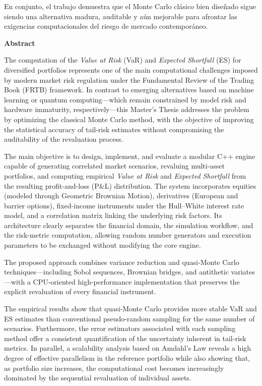 \documentclass[11pt]{article}
\begin{document}
En conjunto, el trabajo demuestra que el Monte Carlo clásico bien diseñado sigue siendo una alternativa madura, auditable y aún mejorable para afrontar las exigencias computacionales del riesgo de mercado contemporáneo.

\newpage

\begin{center}
  \textbf{Abstract}
\end{center}

\noindent
The computation of the \textit{Value at Risk} (VaR) and \textit{Expected Shortfall} (ES) for diversified portfolios represents one of the main computational challenges imposed by modern market risk regulation under the Fundamental Review of the Trading Book (FRTB) framework. In contrast to emerging alternatives based on machine learning or quantum computing---which remain constrained by model risk and hardware immaturity, respectively---this Master's Thesis addresses the problem by optimizing the classical Monte Carlo method, with the objective of improving the statistical accuracy of tail-risk estimates without compromising the auditability of the revaluation process.

The main objective is to design, implement, and evaluate a modular C++ engine capable of generating correlated market scenarios, revaluing multi-asset portfolios, and computing empirical \textit{Value at Risk} and \textit{Expected Shortfall} from the resulting profit-and-loss (P\&L) distribution. The system incorporates equities (modeled through Geometric Brownian Motion), derivatives (European and barrier options), fixed-income instruments under the Hull--White interest rate model, and a correlation matrix linking the underlying risk factors. Its architecture clearly separates the financial domain, the simulation workflow, and the risk-metric computation, allowing random number generators and execution parameters to be exchanged without modifying the core engine.

The proposed approach combines variance reduction and quasi-Monte Carlo techniques---including Sobol sequences, Brownian bridges, and antithetic variates---with a CPU-oriented high-performance implementation that preserves the explicit revaluation of every financial instrument.

The empirical results show that quasi-Monte Carlo provides more stable VaR and ES estimates than conventional pseudo-random sampling for the same number of scenarios. Furthermore, the error estimators associated with each sampling method offer a consistent quantification of the uncertainty inherent in tail-risk metrics. In parallel, a scalability analysis based on Amdahl's Law reveals a high degree of effective parallelism in the reference portfolio while also showing that, as portfolio size increases, the computational cost becomes increasingly dominated by the sequential revaluation of individual assets.
\end{document}
